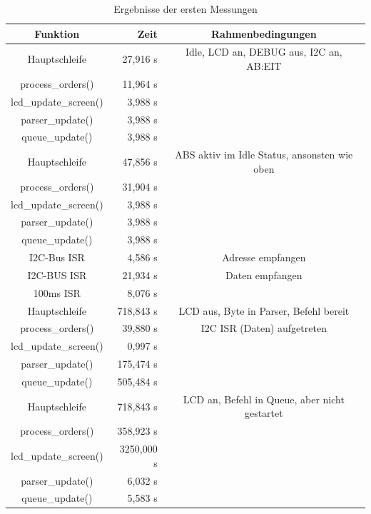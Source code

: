 \begin{table}[htb]
\begin{center}
	\begin{tabular}{|c||r|c|}
		\hline
		\textbf{Funktion} & \textbf{Zeit} & \textbf{Rahmenbedingungen} \\ \hline \hline
		Hauptschleife & 27,916 \textmu{}s & Idle, LCD an, DEBUG aus, I2C an, AB:EIT \\ \hline
		process\_orders() & 11,964 \textmu{}s &  \\ \hline
		lcd\_update\_screen() & 3,988 \textmu{}s &  \\ \hline
		parser\_update() & 3,988 \textmu{}s &  \\ \hline
		queue\_update() & 3,988 \textmu{}s &  \\ \hline \hline
		Hauptschleife & 47,856 \textmu{}s & ABS aktiv im Idle Status, ansonsten wie oben \\ \hline
		process\_orders() & 31,904 \textmu{}s &  \\ \hline
		lcd\_update\_screen() & 3,988 \textmu{}s &  \\ \hline
		parser\_update() & 3,988 \textmu{}s &  \\ \hline
		queue\_update() & 3,988 \textmu{}s &  \\ \hline \hline
		I2C-Bus ISR & 4,586 \textmu{}s & Adresse empfangen \\ \hline
		I2C-BUS ISR & 21,934 \textmu{}s & Daten empfangen \\ \hline
		100ms ISR & 8,076 \textmu{}s & \\ \hline \hline
		Hauptschleife & 718,843 \textmu{}s & LCD aus, Byte in Parser, Befehl bereit \\ \hline
		process\_orders() & 39,880 \textmu{}s & I2C ISR (Daten) aufgetreten \\ \hline
		lcd\_update\_screen() & 0,997 \textmu{}s &  \\ \hline
		parser\_update() & 175,474 \textmu{}s &  \\ \hline
		queue\_update() & 505,484 \textmu{}s &  \\ \hline \hline
		Hauptschleife & 718,843 \textmu{}s & LCD an, Befehl in Queue, aber nicht gestartet \\ \hline
		process\_orders() & 358,923 \textmu{}s &  \\ \hline
		lcd\_update\_screen() & 3250,000 \textmu{}s &  \\ \hline
		parser\_update() & 6,032 \textmu{}s &  \\ \hline
		queue\_update() & 5,583 \textmu{}s &  \\ \hline
	\end{tabular}
	\caption{\label{erste_messung} Ergebnisse der ersten Messungen}
\end{center}
\end{table}

